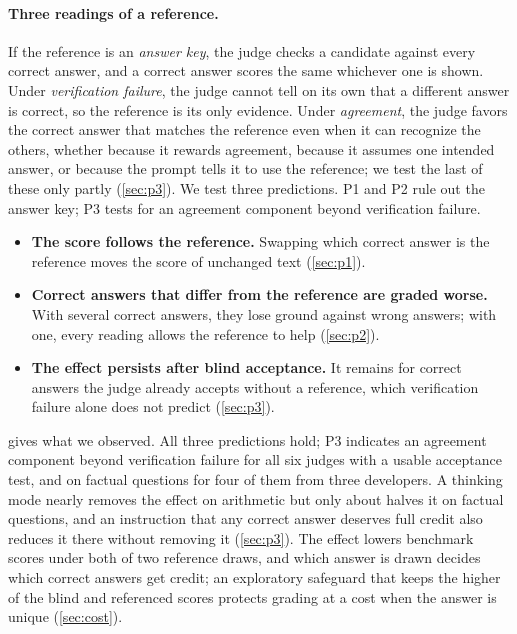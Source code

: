 \documentclass{article}
\begin{document}
\paragraph{Three readings of a reference.}
If the reference is an \emph{answer key}, the judge checks a candidate against every correct answer, and a correct answer scores the same whichever one is shown.
Under \emph{verification failure}, the judge cannot tell on its own that a different answer is correct, so the reference is its only evidence.
Under \emph{agreement}, the judge favors the correct answer that matches the reference even when it can recognize the others, whether because it rewards agreement, because it assumes one intended answer, or because the prompt tells it to use the reference; we test the last of these only partly (\cref{sec:p3}).
We test three predictions. P1 and P2 rule out the answer key; P3 tests for an agreement component beyond verification failure.
\begin{itemize}[leftmargin=1.5em,itemsep=2pt,topsep=2pt]
\item[\textbf{P1}] \textbf{The score follows the reference.} Swapping which correct answer is the reference moves the score of unchanged text (\cref{sec:p1}).
\item[\textbf{P2}] \textbf{Correct answers that differ from the reference are graded worse.} With several correct answers, they lose ground against wrong answers; with one, every reading allows the reference to help (\cref{sec:p2}).
\item[\textbf{P3}] \textbf{The effect persists after blind acceptance.} It remains for correct answers the judge already accepts without a reference, which verification failure alone does not predict (\cref{sec:p3}).
\end{itemize}
 gives what we observed. All three predictions hold; P3 indicates an agreement component beyond verification failure for all six judges with a usable acceptance test, and on factual questions for four of them from three developers. A thinking mode nearly removes the effect on arithmetic but only about halves it on factual questions, and an instruction that any correct answer deserves full credit also reduces it there without removing it (\cref{sec:p3}). The effect lowers benchmark scores under both of two reference draws, and which answer is drawn decides which correct answers get credit; an exploratory safeguard that keeps the higher of the blind and referenced scores protects grading at a cost when the answer is unique (\cref{sec:cost}).
\end{document}
